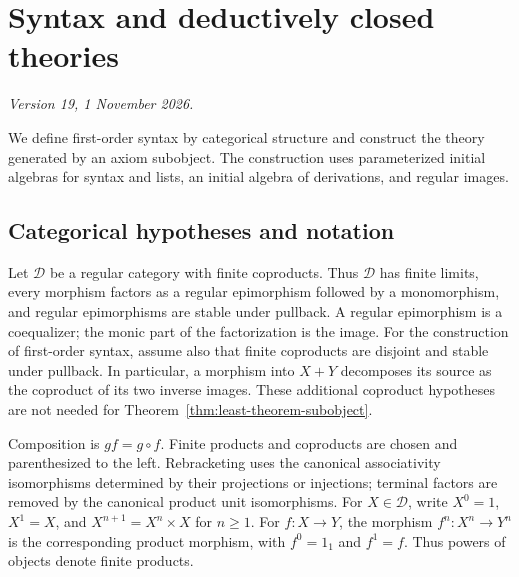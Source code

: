 \documentclass[11pt]{article}
\theoremstyle{definition}\newtheorem{definition}[theorem]{Definition}
\begin{document}
\appendix
\section{Syntax and deductively closed theories}
\label{app:syntax-theories}
\noindent\textit{Version 19, 1 November 2026.}\par\medskip

We define first-order syntax by categorical structure and construct
the theory generated by an axiom subobject. The construction uses
parameterized initial algebras for syntax and lists, an initial algebra
of derivations, and regular images.

\subsection{Categorical hypotheses and notation}
\label{app:categorical-hypotheses}

Let $\mathcal D$ be a regular category with finite coproducts.
Thus $\mathcal D$ has finite limits, every morphism factors as a
regular epimorphism followed by a monomorphism, and regular
epimorphisms are stable under pullback. A regular epimorphism is a
coequalizer; the monic part of the factorization is the image.
For the construction of first-order syntax, assume also that finite
coproducts are disjoint and stable under pullback. In particular,
a morphism into $X+Y$ decomposes its source as the coproduct of its
two inverse images. These additional coproduct hypotheses are not
needed for Theorem~\ref{thm:least-theorem-subobject}.

Composition is $gf=g\circ f$. Finite products and coproducts are
chosen and parenthesized to the left. Rebracketing uses the canonical
associativity isomorphisms determined by their projections or injections;
terminal factors are removed by the canonical product unit isomorphisms.
For $X\in\mathcal D$, write $X^0=1$, $X^1=X$, and
$X^{n+1}=X^n\times X$ for $n\geq1$.
For $f:X\to Y$, the morphism $f^n:X^n\to Y^n$ is the corresponding
product morphism, with $f^0=1_1$ and $f^1=f$.
Thus powers of objects denote finite products.
\end{document}
